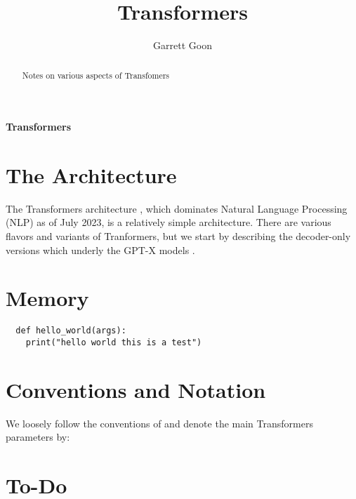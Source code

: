 \documentclass[11pt]{article}
\title{Transformers}
\author{Garrett Goon}
\begin{document}
%

\vspace{1truecm}
%
%
\renewcommand{\thefootnote}{\fnsymbol{footnote}}
\begin{center}
{\huge \bf{Transformers}}
\end{center}


\begin{abstract}

Notes on various aspects of Transfomers

\end{abstract}

\tableofcontents


\renewcommand*{\thefootnote}{\arabic{footnote}}
\setcounter{footnote}{0}



\section{The Architecture}

The Transformers architecture \cite {vaswani2017attention}, which dominates Natural Language
Processing (NLP) as of July 2023, is a relatively simple architecture. There are various flavors and
variants of Tranformers, but we start by describing the decoder-only versions which underly the
GPT-X models \cite {gpt2radford2019language, gpt3brown2020language, gpt4openai2023}.






\section{Memory}



\begin{verbatim}
  def hello_world(args):
    print("hello world this is a test")
\end{verbatim}


\appendix


\section{Conventions and Notation}\label{app:conventions}


We loosely follow the conventions of \cite{korthikanti2022reducing} and denote the main Transformers
parameters by:

\section{To-Do}\label{app:todo}




\end{document}
